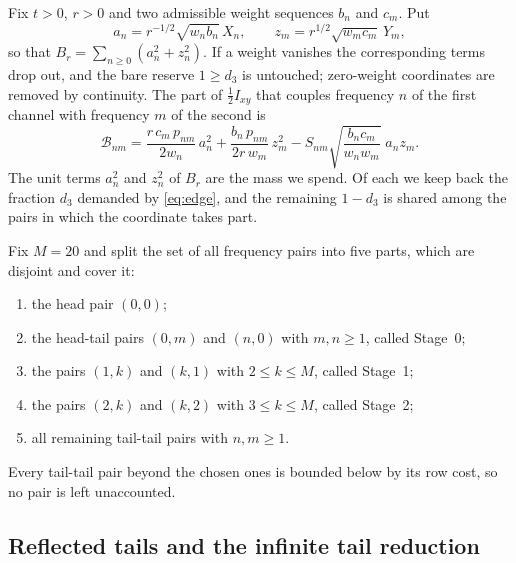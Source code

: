 \documentclass[10pt]{article}
\theoremstyle{remark}
\newcommand{\dthree}{d_{3}}
\begin{document}
Fix $t>0$, $r>0$ and two admissible weight sequences $b_n$ and $c_m$. Put
\[
a_n=r^{-1/2}\sqrt{w_nb_n}\,X_n,\qquad z_m=r^{1/2}\sqrt{w_mc_m}\,Y_m,
\]
so that $B_r=\sum_{n\ge0}(a_n^2+z_n^2)$. If a weight vanishes the corresponding terms drop out, and the bare reserve $1\ge\dthree$ is untouched; zero-weight coordinates are removed by continuity. The part of $\tfrac12I_{xy}$ that couples frequency $n$ of the first channel with frequency $m$ of the second is
\begin{equation}\label{eq:block}
\mathcal B_{nm}=\frac{r\,c_m\,p_{nm}}{2w_n}\,a_n^2+\frac{b_n\,p_{nm}}{2r\,w_m}\,z_m^2-S_{nm}\sqrt{\frac{b_nc_m}{w_nw_m}}\;a_nz_m .
\end{equation}
The unit terms $a_n^2$ and $z_n^2$ of $B_r$ are the mass we spend. Of each we keep back the fraction $\dthree$ demanded by \eqref{eq:edge}, and the remaining $1-\dthree$ is shared among the pairs in which the coordinate takes part.

Fix $M=20$ and split the set of all frequency pairs into five parts, which are disjoint and cover it:
\begin{enumerate}
\item the head pair $(0,0)$;
\item the head-tail pairs $(0,m)$ and $(n,0)$ with $m,n\ge1$, called Stage~0;
\item the pairs $(1,k)$ and $(k,1)$ with $2\le k\le M$, called Stage~1;
\item the pairs $(2,k)$ and $(k,2)$ with $3\le k\le M$, called Stage~2;
\item all remaining tail-tail pairs with $n,m\ge1$.
\end{enumerate}
Every tail-tail pair beyond the chosen ones is bounded below by its row cost, so no pair is left unaccounted.

\subsection{Reflected tails and the infinite tail reduction}
\end{document}
